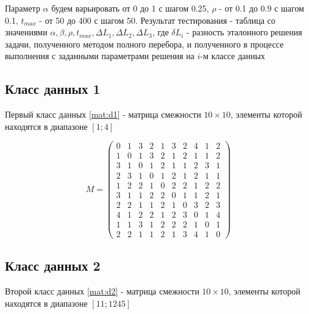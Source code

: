 \documentclass[a4paper,oneside,14pt]{extreport}
\begin{document}
Параметр $\alpha$ будем варьировать от 0 до 1 с шагом 0.25, $\rho$  - от 0.1 до 0.9 с шагом 0.1, $t_{max}$ - от 50 до 400 с шагом 50. Результат тестирования - таблица со значениями $\alpha, \beta, \rho, t_{max}, \Delta L_{1}, \Delta L_{2}, \Delta L_{3}$, где $\delta L_{i}$ - разность эталонного решения задачи, полученного методом полного перебора, и полученного в процессе выполнения с заданными параметрами решения на $i$-м классе данных\\

\subsection*{Класс данных 1}
Первый класс данных \ref{mat:d1} - матрица смежности $10\times10$, элементы которой находятся в диапазоне $[1;4]$

\begin{equation}
\label{mat:d1}
M = 
\begin{pmatrix} 
	0 & 1 & 3 & 2 & 1 & 3 & 2 & 4 & 1 & 2 \\
	1 & 0 & 1 & 3 & 2 & 1 & 2 & 1 & 1 & 2 \\
	3 & 1 & 0 & 1 & 2 & 1 & 1 & 2 & 3 & 1 \\
	2 & 3 & 1 & 0 & 1 & 2 & 1 & 2 & 1 & 1 \\
	1 & 2 & 2 & 1 & 0 & 2 & 2 & 1 & 2 & 2 \\
	3 & 1 & 1 & 2 & 2 & 0 & 1 & 1 & 2 & 1 \\
	2 & 2 & 1 & 1 & 2 & 1 & 0 & 3 & 2 & 3 \\
	4 & 1 & 2 & 2 & 1 & 2 & 3 & 0 & 1 & 4 \\
	1 & 1 & 3 & 1 & 2 & 2 & 2 & 1 & 0 & 1 \\
	2 & 2 & 1 & 1 & 2 & 1 & 3 & 4 & 1 & 0
\end{pmatrix}
\end{equation}

\subsection*{Класс данных 2}
Второй класс данных \ref{mat:d2} - матрица смежности $10\times10$, элементы которой находятся в диапазоне $[11;1245]$
\end{document}
